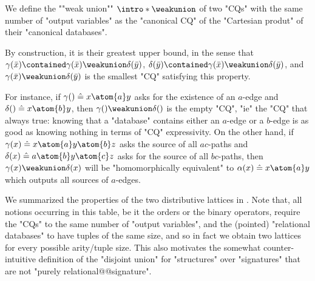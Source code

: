 \begin{definition}
	We define the \AP""weak union"" \AP$\intro*\weakunion$ of two "CQs"
	with the same number of "output variables"
	as the "canonical CQ" of the "Cartesian produt" of their "canonical databases".
\end{definition}

By construction, it is their greatest upper bound,
in the sense that
$\gamma(\bar x) \contained \gamma(\bar x) \weakunion \delta(\bar y)$,
$\delta(\bar y) \contained \gamma(\bar x) \weakunion \delta(\bar y)$,
and $\gamma(\bar x) \weakunion \delta(\bar y)$ is the smallest "CQ" satisfying this property.

For instance, if $\gamma() \defeq x \atom{a} y$ asks for the existence of an $a$-edge
and $\delta() \defeq x \atom{b} y$, then $\gamma() \weakunion \delta()$ is the empty "CQ",
"ie" the "CQ" that always true: knowing that a "database" contains either an $a$-edge
or a $b$-edge is as good as knowing nothing in terms of "CQ" expressivity.
On the other hand, if $\gamma(x) \defeq x \atom{a} y \atom{b} z$ asks the source of all 
$ac$-paths and $\delta(x) \defeq a \atom{b} y \atom{c} z$ asks for the source of all $bc$-paths,
then $\gamma(x) \weakunion \delta(x)$ will be "homomorphically equivalent" to
$\alpha(x) \defeq x \atom{a} y$ which outputs all sources of $a$-edges.

We summarized the properties of the two distributive lattices
in . Note that, all notions
occurring in this table, be it the orders or the binary operators,
require the "CQs" to the same number of "output variables",
and the (pointed) "relational databases" to have tuples of the same size,
and so in fact we obtain two lattices for every possible arity/tuple size.
This also motivates the somewhat counter-intuitive definition of the
"disjoint union" for "structures" over "signatures" that are not
"purely relational@@signature".

